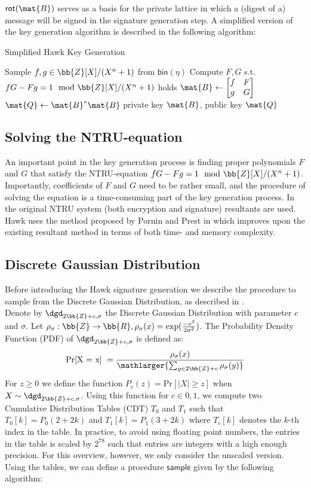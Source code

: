 $\mathsf{rot}(\mat{B})$ serves as a basis for the private lattice in which a (digest of a) message will be signed in the signature generation step.
A simplified version of the key generation algorithm is described in the following algorithm:
\begin{algorithm}[H]\label{Simplified Hawk Key Generation}
\caption{Simplified Hawk Key Generation}
\begin{algorithmic}[1]
    \State Sample $f, g \in \bb{Z}[X] / (X^n + 1)$ from $\mathsf{bin}(\eta)$
    \State Compute $F, G$ s.t. $fG - Fg = 1 \mod \bb{Z}[X] / (X^n + 1)$ holds
    \State $\mat{B} \gets \begin{bmatrix} f & F \\ g & G \end{bmatrix}$
    \State $\mat{Q} \gets \mat{B}^* \mat{B}$
    \State \Return private key $\mat{B}$, public key $\mat{Q}$
\end{algorithmic}
\end{algorithm}
\subsection{Solving the NTRU-equation}
An important point in the key generation process is finding proper polynomials $F$ and $G$ that satisfy the NTRU-equation $fG - Fg = 1 \mod \bb{Z}[X] / (X^n + 1)$.
Importantly, coefficients of $F$ and $G$ need to be rather small, and the procedure of solving the equation is a time-consuming part of the key generation process. 
In the original NTRU system (both encryption and signature) resultants are used. Hawk uses the method proposed by Pornin and Prest in \cite{PP19} which improves upon the existing
resultant method in terms of both time- and memory complexity.

\subsection{Discrete Gaussian Distribution}
Before introducing the Hawk signature generation we describe the procedure to sample from the Discrete Gaussian Distribution, as described in \cite{HawkSpec24}. \\
Denote by $\dgd_{2\bb{Z} + c, \sigma }$ the Discrete Gaussian Distribution with parameter $c$ and $\sigma$.
Let $\rho_{\sigma}: \bb{Z} \rightarrow \bb{R}, \rho_{\sigma}(x) = \exp(\frac{-x^2}{2\sigma^2})$.
The Probability Density Function (PDF) of $\dgd_{2\bb{Z} + c, \sigma }$ is defined as:
\[
    \text{Pr[X = x] } = \frac{\rho_{\sigma}(x)}{\mathlarger{\sum_{y \in 2\bb{Z} + c} \rho_{\sigma}(y)}}
\]
For $z \geq 0$ we define the function $P_c(z) = \text{Pr}[ |X| \geq z ]$ when $X \sim \dgd_{2\bb{Z}+c, \sigma}$.
Using this function for $c \in {0, 1}$, we compute two Cumulative Distribution Tables (CDT) $T_0$ and $T_1$
such that $T_0[k] = P_0(2+2k)$ and $T_1[k] = P_1(3+2k)$ where $T_c[k]$ denotes the $k$-th index in the table.
In practice, to avoid using floating point numbers, the entries in the table is scaled by $2^{78}$ such that 
entries are integers with a high enough precision. For this overview, however, we only consider the unscaled version.
Using the tables, we can define a procedure $\mathsf{sample}$ given by the following algorithm:

